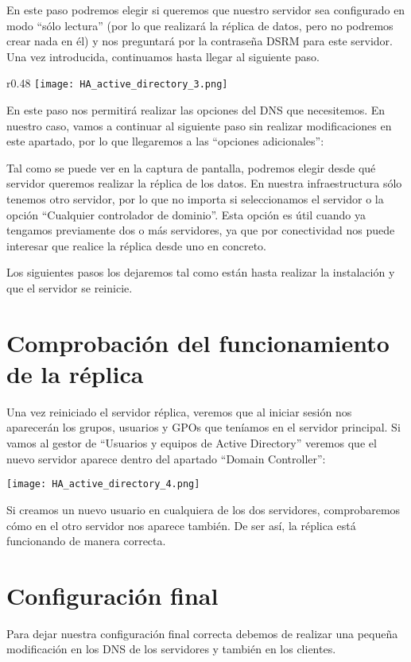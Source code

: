 En este paso podremos elegir si queremos que nuestro servidor sea configurado en modo “sólo lectura” (por lo que realizará la réplica de datos, pero no podremos crear nada en él) y nos preguntará por la contraseña DSRM para este servidor. Una vez introducida, continuamos hasta llegar al siguiente paso.

\begin{wrapfigure}{r}{0.48\linewidth}
    \centering
        \vspace{-10pt}
    \texttt{[image: HA\_active\_directory\_3.png]}
\end{wrapfigure}
En este paso nos permitirá realizar las opciones del DNS que necesitemos. En nuestro caso, vamos a continuar al siguiente paso sin realizar modificaciones en este apartado, por lo que llegaremos a las “opciones adicionales”:

Tal como se puede ver en la captura de pantalla, podremos elegir desde qué servidor queremos realizar la réplica de los datos. En nuestra infraestructura sólo tenemos otro servidor, por lo que no importa si seleccionamos el servidor o la opción “Cualquier controlador de dominio”. Esta opción es útil cuando ya tengamos previamente dos o más servidores, ya que por conectividad nos puede interesar que realice la réplica desde uno en concreto.

Los siguientes pasos los dejaremos tal como están hasta realizar la instalación y que el servidor se reinicie.

\section{Comprobación del funcionamiento de la réplica}
Una vez reiniciado el servidor réplica, veremos que al iniciar sesión nos aparecerán los grupos, usuarios y GPOs que teníamos en el servidor principal. Si vamos al gestor de “Usuarios y equipos de Active Directory” veremos que el nuevo servidor aparece dentro del apartado “Domain Controller”:

\begin{center}
    \vspace{-10pt}
    \texttt{[image: HA\_active\_directory\_4.png]}
\end{center}

Si creamos un nuevo usuario en cualquiera de los dos servidores, comprobaremos cómo en el otro servidor nos aparece también. De ser así, la réplica está funcionando de manera correcta.

\section{Configuración final}
Para dejar nuestra configuración final correcta debemos de realizar una pequeña modificación en los DNS de los servidores y también en los clientes.

